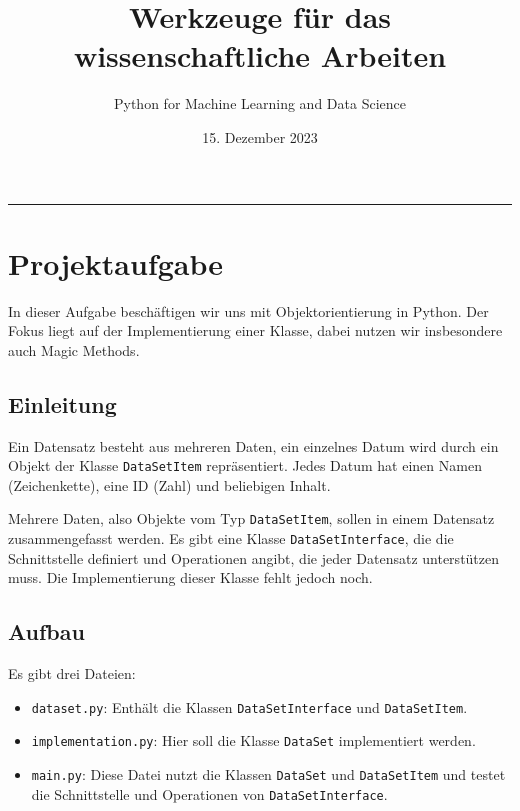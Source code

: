 \documentclass[a4paper,12pt]{article}
\title{Werkzeuge für das wissenschaftliche Arbeiten}
\author{Python for Machine Learning and Data Science}
\date{15. Dezember 2023}
\begin{document}
\maketitle
\hrule
\vspace{1cm}

\tableofcontents
\newpage

\section{Projektaufgabe}
In dieser Aufgabe beschäftigen wir uns mit Objektorientierung in Python. Der Fokus liegt auf der Implementierung einer Klasse, dabei nutzen wir insbesondere auch Magic Methods.

\subsection{Einleitung}
Ein Datensatz besteht aus mehreren Daten, ein einzelnes Datum wird durch ein Objekt der Klasse \texttt{DataSetItem} repräsentiert. Jedes Datum hat einen Namen (Zeichenkette), eine ID (Zahl) und beliebigen Inhalt.

Mehrere Daten, also Objekte vom Typ \texttt{DataSetItem}, sollen in einem Datensatz zusammengefasst werden. Es gibt eine Klasse \texttt{DataSetInterface}, die die Schnittstelle definiert und Operationen angibt, die jeder Datensatz unterstützen muss. Die Implementierung dieser Klasse fehlt jedoch noch.

\subsection{Aufbau}
Es gibt drei Dateien:
\begin{itemize}
    \item \texttt{dataset.py}: Enthält die Klassen \texttt{DataSetInterface} und \texttt{DataSetItem}.
    \item \texttt{implementation.py}: Hier soll die Klasse \texttt{DataSet} implementiert werden.
    \item \texttt{main.py}: Diese Datei nutzt die Klassen \texttt{DataSet} und \texttt{DataSetItem} und testet die Schnittstelle und Operationen von \texttt{DataSetInterface}.
\end{itemize}
\end{document}
